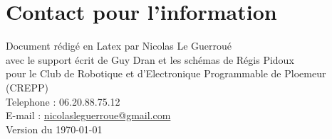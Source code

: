 
\section*{Contact pour l'information}

Document rédigé en Latex par Nicolas Le Guerroué \\
avec le support écrit de Guy Dran et les schémas de Régis Pidoux\\
pour le Club de Robotique et d'Electronique Programmable de Ploemeur (CREPP) \\
Telephone : 06.20.88.75.12 \\
E-mail : \href{mailto:nicolasleguerroue@gmail.com}{nicolasleguerroue@gmail.com} \\
Version du \today \\




